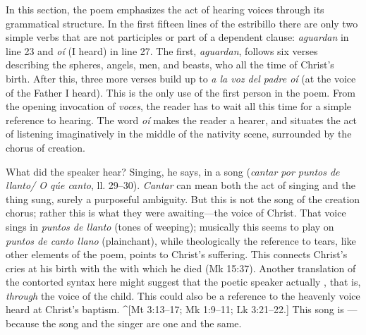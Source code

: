 In this section, the poem emphasizes the act of hearing voices through its
grammatical structure.
In the first fifteen lines of the estribillo there are only two simple verbs
that are not participles or part of a dependent clause: \emph{aguardan} in line 23 and
\emph{oí} (I heard) in line 27.
The first, \emph{aguardan}, follows six verses describing the spheres, angels, men,
and beasts, who all  the time of Christ's birth.
After this, three more verses build up to \emph{a la voz del padre oí} (at the voice
of the Father I heard).
This is the only use of the first person in the poem.
From the opening invocation of \emph{voces}, the reader has to wait all this time for
a simple reference to hearing.
The word \emph{oí} makes the reader a hearer, and situates the act of listening
imaginatively in the middle of the nativity scene, surrounded by the chorus of
creation.

What did the speaker hear? 
Singing, he says, in a song (\emph{cantar por puntos de llanto/ O qúe canto}, ll.
29--30).
\emph{Cantar} can mean both the act of singing and the thing sung, surely a
purposeful ambiguity.
But this is not the song of the creation chorus; rather this is what they were
awaiting---the voice of Christ.
That voice sings in \emph{puntos de llanto} (tones of weeping); musically this seems
to play on \emph{puntos de canto llano} (plainchant), while theologically the
reference to tears, like other elements of the poem, points to Christ's
suffering.
This connects Christ's cries at his birth with the  with which he
died (Mk 15:37).
Another translation of the contorted syntax here might suggest that the poetic
speaker actually , that is,
\emph{through} the voice of the child.
This could also be a reference to the heavenly voice heard at Christ's baptism.
^[Mt 3:13--17; Mk 1:9--11; Lk 3:21--22.]
This song is ---because the song
and the singer are one and the same.

